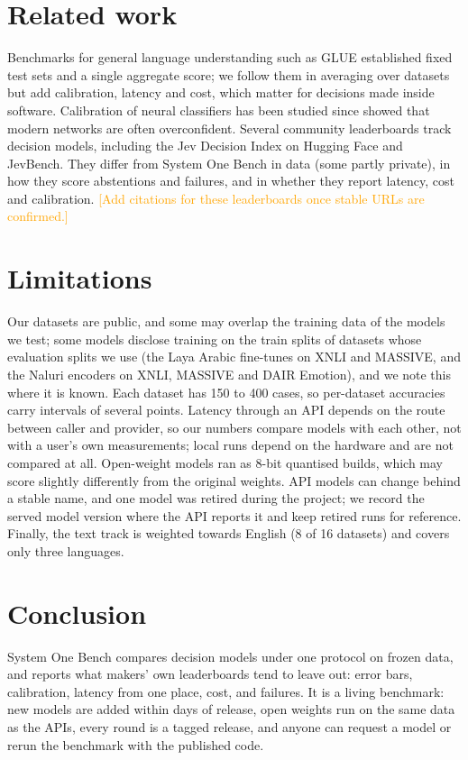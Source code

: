 \documentclass[11pt]{article}
\newcommand{\draftnote}[1]{\textcolor{orange}{[#1]}}
\begin{document}
\section{Related work}

Benchmarks for general language understanding such as GLUE \citep{wang2018glue} established fixed test sets and a
single aggregate score; we follow them in averaging over datasets but add calibration, latency and cost, which matter
for decisions made inside software. Calibration of neural classifiers has been studied since \citet{guo2017calibration}
showed that modern networks are often overconfident. Several community leaderboards track decision models, including
the Jev Decision Index on Hugging Face and JevBench. They differ from System One Bench in data (some partly private),
in how they score abstentions and failures, and in whether they report latency, cost and calibration.
\draftnote{Add citations for these leaderboards once stable URLs are confirmed.}

\section{Limitations}

Our datasets are public, and some may overlap the training data of the models we test; some models disclose
training on the train splits of datasets whose evaluation splits we use (the Laya Arabic fine-tunes on XNLI and
MASSIVE, and the Naluri encoders on XNLI, MASSIVE and DAIR Emotion), and we note this where it is known. Each dataset has 150 to
400 cases, so per-dataset accuracies carry intervals of several points. Latency through an API depends on the route
between caller and provider, so our numbers compare models with each other, not with a user's own measurements; local runs depend on the
hardware and are not compared at all. Open-weight models ran as 8-bit quantised builds, which may score slightly
differently from the original weights. API
models can change behind a stable name, and one model was retired during the project; we record the served model
version where the API reports it and keep retired runs for reference. Finally, the text track
is weighted towards English (8 of 16 datasets) and covers only three languages.

\section{Conclusion}

System One Bench compares decision models under one protocol on frozen data, and reports what makers' own
leaderboards tend to leave out: error bars, calibration, latency from one place, cost, and failures. It is a living
benchmark: new models are added within days of release, open weights run on the same data as the APIs, every
round is a tagged release, and anyone can request a
model or rerun the benchmark with the published code.



\end{document}
